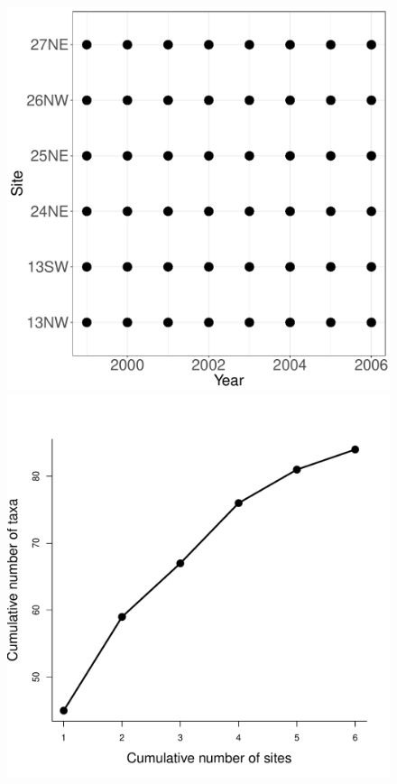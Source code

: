 \documentclass[11pt, oneside]{article}
\begin{document}
\begin{figure}[h!]
\includegraphics[scale = 0.4]{sgs-plants-catano_spatiotemporal_sampling_effort.pdf}
\includegraphics[scale = 0.4]{sgs-plants-catano_species_accumulation_space.pdf}

\end{figure}
\end{document}

